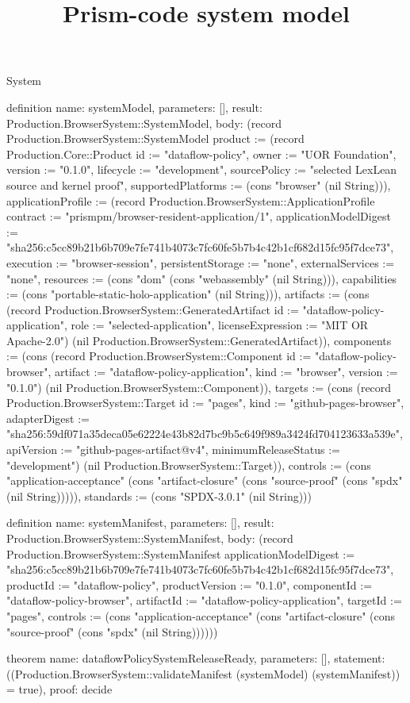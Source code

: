 \begin{lexlean}{System}
\title{Prism-code system model}
\begin{semanticmodule}
definition{
  name: systemModel,
  parameters: [],
  result: Production.BrowserSystem::SystemModel,
  body: (record Production.BrowserSystem::SystemModel {product := (record Production.Core::Product {id := "dataflow-policy", owner := "UOR Foundation", version := "0.1.0", lifecycle := "development", sourcePolicy := "selected LexLean source and kernel proof", supportedPlatforms := (cons "browser" (nil String))}), applicationProfile := (record Production.BrowserSystem::ApplicationProfile {contract := "prismpm/browser-resident-application/1", applicationModelDigest := "sha256:c5cc89b21b6b709e7fe741b4073c7fc60fe5b7b4c42b1cf682d15fc95f7dce73", execution := "browser-session", persistentStorage := "none", externalServices := "none", resources := (cons "dom" (cons "webassembly" (nil String))), capabilities := (cons "portable-static-holo-application" (nil String))}), artifacts := (cons (record Production.BrowserSystem::GeneratedArtifact {id := "dataflow-policy-application", role := "selected-application", licenseExpression := "MIT OR Apache-2.0"}) (nil Production.BrowserSystem::GeneratedArtifact)), components := (cons (record Production.BrowserSystem::Component {id := "dataflow-policy-browser", artifact := "dataflow-policy-application", kind := "browser", version := "0.1.0"}) (nil Production.BrowserSystem::Component)), targets := (cons (record Production.BrowserSystem::Target {id := "pages", kind := "github-pages-browser", adapterDigest := "sha256:59df071a35deca05e62224e43b82d7bc9b5c649f989a3424fd704123633a539e", apiVersion := "github-pages-artifact@v4", minimumReleaseStatus := "development"}) (nil Production.BrowserSystem::Target)), controls := (cons "application-acceptance" (cons "artifact-closure" (cons "source-proof" (cons "spdx" (nil String))))), standards := (cons "SPDX-3.0.1" (nil String))})
}

definition{
  name: systemManifest,
  parameters: [],
  result: Production.BrowserSystem::SystemManifest,
  body: (record Production.BrowserSystem::SystemManifest {applicationModelDigest := "sha256:c5cc89b21b6b709e7fe741b4073c7fc60fe5b7b4c42b1cf682d15fc95f7dce73", productId := "dataflow-policy", productVersion := "0.1.0", componentId := "dataflow-policy-browser", artifactId := "dataflow-policy-application", targetId := "pages", controls := (cons "application-acceptance" (cons "artifact-closure" (cons "source-proof" (cons "spdx" (nil String)))))})
}

theorem{
  name: dataflowPolicySystemReleaseReady,
  parameters: [],
  statement: ((Production.BrowserSystem::validateManifest (systemModel) (systemManifest)) = true),
  proof: decide{}
}
\end{semanticmodule}
\end{lexlean}
